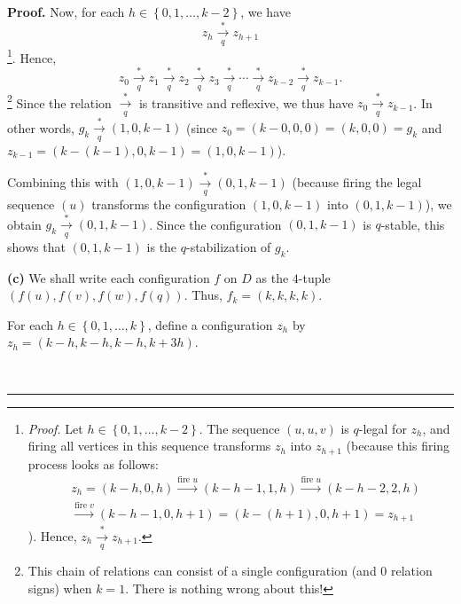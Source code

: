 \documentclass[numbers=enddot,12pt,final,onecolumn,notitlepage]{scrartcl}%
\theoremstyle{definition}
\newenvironment{proof}[1][Proof]{\noindent\textbf{#1.} }{\ \rule{0.5em}{0.5em}}
\begin{document}
\begin{proof}
Now, for each $h\in\left\{  0,1,\ldots,k-2\right\}  $, we have%
\[
z_{h}\underset{q}{\overset{\ast}{\rightarrow}}z_{h+1}%
\]
\footnote{\textit{Proof.} Let $h\in\left\{  0,1,\ldots,k-2\right\}  $. The
sequence $\left(  u,u,v\right)  $ is $q$-legal for $z_{h}$, and firing all
vertices in this sequence transforms $z_{h}$ into $z_{h+1}$ (because this
firing process looks as follows:%
\begin{align*}
&  z_{h}=\left(  k-h,0,h\right)  \overset{\text{fire }u}{\longrightarrow
}\left(  k-h-1,1,h\right)  \overset{\text{fire }u}{\longrightarrow}\left(
k-h-2,2,h\right) \\
&  \overset{\text{fire }v}{\longrightarrow}\left(  k-h-1,0,h+1\right)
=\left(  k-\left(  h+1\right)  ,0,h+1\right)  =z_{h+1}%
\end{align*}
). Hence, $z_{h}\underset{q}{\overset{\ast}{\rightarrow}}z_{h+1}$.}. Hence,%
\[
z_{0}\underset{q}{\overset{\ast}{\rightarrow}}z_{1}\underset{q}{\overset{\ast
}{\rightarrow}}z_{2}\underset{q}{\overset{\ast}{\rightarrow}}z_{3}%
\underset{q}{\overset{\ast}{\rightarrow}}\cdots\underset{q}{\overset{\ast
}{\rightarrow}}z_{k-2}\underset{q}{\overset{\ast}{\rightarrow}}z_{k-1}.
\]
\footnote{This chain of relations can consist of a single configuration (and
$0$ relation signs) when $k=1$. There is nothing wrong about this!} Since the
relation $\underset{q}{\overset{\ast}{\rightarrow}}$ is transitive and
reflexive, we thus have $z_{0}\underset{q}{\overset{\ast}{\rightarrow}}%
z_{k-1}$. In other words, $g_{k}\underset{q}{\overset{\ast}{\rightarrow}%
}\left(  1,0,k-1\right)  $ (since $z_{0}=\left(  k-0,0,0\right)  =\left(
k,0,0\right)  =g_{k}$ and $z_{k-1}=\left(  k-\left(  k-1\right)
,0,k-1\right)  =\left(  1,0,k-1\right)  $).

Combining this with $\left(  1,0,k-1\right)  \underset{q}{\overset{\ast
}{\rightarrow}}\left(  0,1,k-1\right)  $ (because firing the legal sequence
$\left(  u\right)  $ transforms the configuration $\left(  1,0,k-1\right)  $
into $\left(  0,1,k-1\right)  $), we obtain $g_{k}\underset{q}{\overset{\ast
}{\rightarrow}}\left(  0,1,k-1\right)  $. Since the configuration $\left(
0,1,k-1\right)  $ is $q$-stable, this shows that $\left(  0,1,k-1\right)  $ is
the $q$-stabilization of $g_{k}$.

\textbf{(c)} We shall write each configuration $f$ on $D$ as the $4$-tuple
$\left(  f\left(  u\right)  ,f\left(  v\right)  ,f\left(  w\right)  ,f\left(
q\right)  \right)  $. Thus, $f_{k}=\left(  k,k,k,k\right)  $.

For each $h\in\left\{  0,1,\ldots,k\right\}  $, define a configuration $z_{h}$
by $z_{h}=\left(  k-h,k-h,k-h,k+3h\right)  $.


\end{proof}
\end{document}
